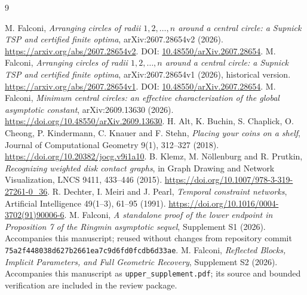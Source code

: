 \documentclass[11pt,letterpaper]{article}
\theoremstyle{definition}\newtheorem{definition}[theorem]{Definition}
\theoremstyle{remark}\newtheorem{remark}[theorem]{Remark}
\begin{document}
\begin{thebibliography}{9}
\small\raggedright
{} M. Falconi, \emph{Arranging circles of radii $1,2,\ldots,n$
around a central circle: a Supnick TSP and certified finite optima},
arXiv:2607.28654v2 (2026).
\url{https://arxiv.org/abs/2607.28654v2}.
DOI: \href{https://doi.org/10.48550/arXiv.2607.28654}{10.48550/arXiv.2607.28654}.
 M. Falconi, \emph{Arranging circles of radii $1,2,\ldots,n$
around a central circle: a Supnick TSP and certified finite optima},
arXiv:2607.28654v1 (2026), historical version.
\url{https://arxiv.org/abs/2607.28654v1}.
DOI: \href{https://doi.org/10.48550/arXiv.2607.28654}{10.48550/arXiv.2607.28654}.
 M. Falconi, \emph{Minimum central circles:
an effective characterization of the global asymptotic constant},
arXiv:2609.13630 (2026).
\url{https://doi.org/10.48550/arXiv.2609.13630}.
 H. Alt, K. Buchin, S. Chaplick, O. Cheong, P. Kindermann,
C. Knauer and F. Stehn, \emph{Placing your coins on a shelf},
Journal of Computational Geometry 9(1), 312--327 (2018).
\url{https://doi.org/10.20382/jocg.v9i1a10}.
 B. Klemz, M. N\"ollenburg and R. Prutkin,
\emph{Recognizing weighted disk contact graphs}, in Graph Drawing and
Network Visualization, LNCS 9411, 433--446 (2015).
\url{https://doi.org/10.1007/978-3-319-27261-0_36}.
 R. Dechter, I. Meiri and J. Pearl,
\emph{Temporal constraint networks}, Artificial Intelligence
49(1--3), 61--95 (1991).
\url{https://doi.org/10.1016/0004-3702(91)90006-6}.
 M. Falconi, \emph{A standalone proof of the lower endpoint
in Proposition 7 of the Ringmin asymptotic sequel}, Supplement S1 (2026).
Accompanies this manuscript; reused without changes from repository
commit \texttt{75a2f448038d627b2661ea7c9d6fd0fcdb6d33ae}.
 M. Falconi, \emph{Reflected Blocks, Implicit Parameters,
and Full Geometric Recovery}, Supplement S2 (2026).
Accompanies this manuscript as \texttt{upper\_supplement.pdf};
its source and bounded verification are included in the review package.
\end{thebibliography}
\end{document}
